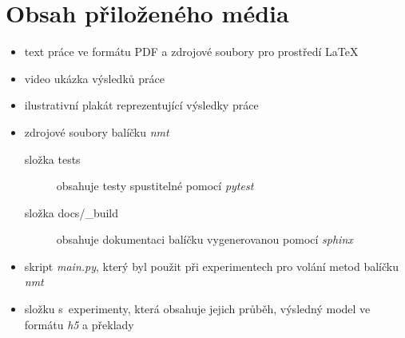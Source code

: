 \chapter{Obsah přiloženého média}
\begin{itemize}
  \item text práce ve formátu PDF a zdrojové soubory pro prostředí \LaTeX
  \item video ukázka výsledků práce
  \item ilustrativní plakát reprezentující výsledky práce
  \item zdrojové soubory balíčku \emph{nmt}
    \begin{description}
      \item[složka tests] obsahuje testy spustitelné pomocí \emph{pytest}
      \item[složka docs/\_build] obsahuje dokumentaci balíčku vygenerovanou pomocí \emph{sphinx}
    \end{description}
  \item skript \emph{main.py}, který byl použit při experimentech pro volání metod balíčku \emph{nmt}
  \item složku s~experimenty, která obsahuje jejich průběh, výsledný model ve formátu \emph{h5} a překlady
\end{itemize}

